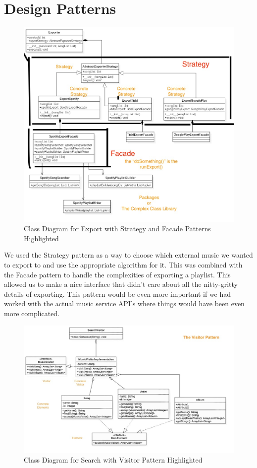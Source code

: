 \documentclass[12pt]{article}
\begin{document}
\section{Design Patterns}
\begin{figure}[H]
	\centering
	\includegraphics[scale=0.25]{ExportClassDiagram.jpg}
	\caption{Class Diagram for Export with Strategy and Facade Patterns Highlighted}
	\label{fig:classDiagExportPattern}
\end{figure}
We used the Strategy pattern as a way to choose which external music we wanted to export to and use the appropriate algorithm for it. This was combined with the Facade pattern to handle the complexities of exporting a playlist. This allowed us to make a nice interface that didn't care about all the nitty-gritty details of exporting. This pattern would be even more important if we had worked with the actual music service API's where things would have been even more complicated. 
\begin{figure}[H]
	\centering
	\includegraphics[scale=0.25]{Search.jpg}
	\caption{Class Diagram for Search with Visitor Pattern Highlighted}
	\label{fig:classDiagSearchPattern}
\end{figure}
\end{document}

